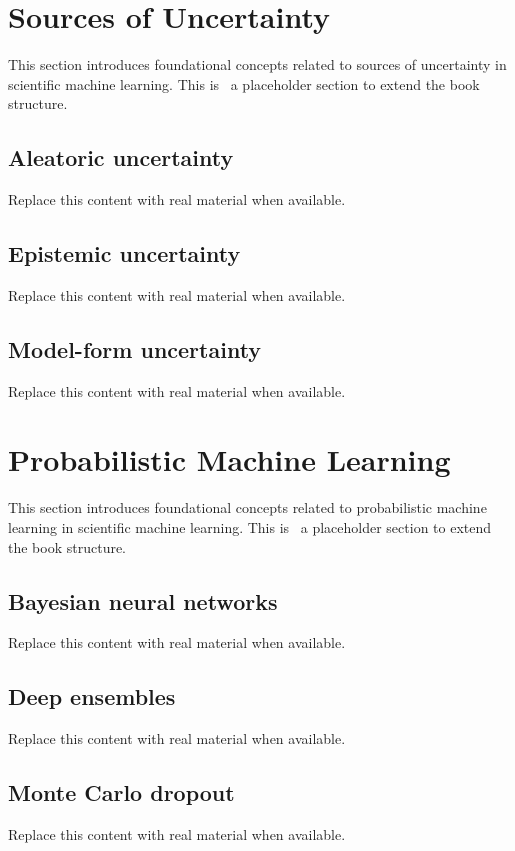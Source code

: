 
\section{Sources of Uncertainty}
This section introduces foundational concepts related to sources of uncertainty in scientific machine learning. This is~\cite{abdulmaksoudTransformerBasedSensorFusion2025} a placeholder section to extend the book structure.

\subsection{Aleatoric uncertainty}
Replace this content with real material when available.

\subsection{Epistemic uncertainty}
Replace this content with real material when available.

\subsection{Model-form uncertainty}
Replace this content with real material when available.

\section{Probabilistic Machine Learning}
This section introduces foundational concepts related to probabilistic machine learning in scientific machine learning. This is~\cite{abdulmaksoudTransformerBasedSensorFusion2025} a placeholder section to extend the book structure.

\subsection{Bayesian neural networks}
Replace this content with real material when available.

\subsection{Deep ensembles}
Replace this content with real material when available.

\subsection{Monte Carlo dropout}
Replace this content with real material when available.

